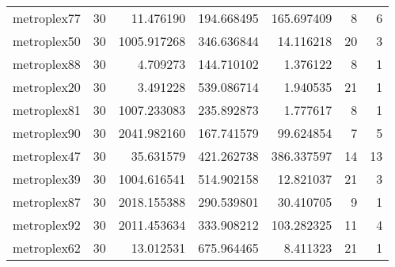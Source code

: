 \begin{longtable}{|l|r|r|r|r|r|r|}
metroplex77 & 30 & 11.476190 & 194.668495 & 165.697409 & 8 & 6 \\
metroplex50 & 30 & 1005.917268 & 346.636844 & 14.116218 & 20 & 3 \\
metroplex88 & 30 & 4.709273 & 144.710102 & 1.376122 & 8 & 1 \\
metroplex20 & 30 & 3.491228 & 539.086714 & 1.940535 & 21 & 1 \\
metroplex81 & 30 & 1007.233083 & 235.892873 & 1.777617 & 8 & 1 \\
metroplex90 & 30 & 2041.982160 & 167.741579 & 99.624854 & 7 & 5 \\
metroplex47 & 30 & 35.631579 & 421.262738 & 386.337597 & 14 & 13 \\
metroplex39 & 30 & 1004.616541 & 514.902158 & 12.821037 & 21 & 3 \\
metroplex87 & 30 & 2018.155388 & 290.539801 & 30.410705 & 9 & 1 \\
metroplex92 & 30 & 2011.453634 & 333.908212 & 103.282325 & 11 & 4 \\
metroplex62 & 30 & 13.012531 & 675.964465 & 8.411323 & 21 & 1 \\
\end{longtable}
